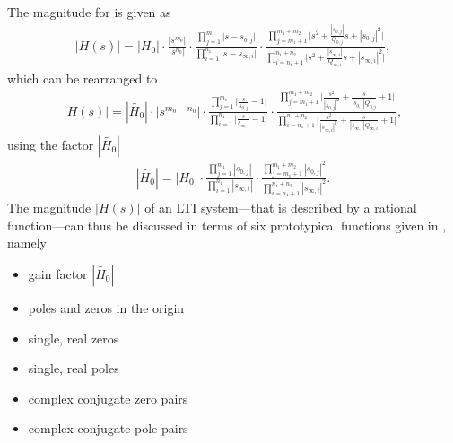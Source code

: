 The magnitude for  is given as
\begin{align}
|H(s)| = |H_0|
\cdot
\frac
{|s^{m_0}|}
{|s^{n_0}|}
\cdot
\frac
{\prod\limits_{j=1}^{m_1} \bigg|s-s_{0,j}\bigg|}
{\prod\limits_{i=1}^{n_1} \bigg|s-s_{\infty,i}\bigg|}
\cdot
\frac
{\prod\limits_{j=m_1+1}^{m_1+m_2} \bigg|s^2 + \frac{|s_{0,j}|}{Q_{0,j}} s + |s_{0,j}|^2\bigg|}
{\prod\limits_{i=n_1+1}^{n_1+n_2} \bigg|s^2 + \frac{|s_{\infty,i}|}{Q_{\infty,i}} s + |s_{\infty,i}|^2\bigg|},
\end{align}
which can be rearranged to
\begin{align}
\label{eq:Hs_sorted_for_Bode_Mag}
|H(s)| = |\tilde{H_0}|
\cdot
|s^{m_0-n_0}|
\cdot
\frac
{\prod\limits_{j=1}^{m_1} \bigg|\frac{s}{s_{0,j}}-1\bigg|}
{\prod\limits_{i=1}^{n_1} \bigg|\frac{s}{s_{\infty,i}}-1\bigg|}
\cdot
\frac
{\prod\limits_{j=m_1+1}^{m_1+m_2} \bigg|\frac{s^2}{|s_{0,j}|^2} + \frac{s}{|s_{0,j}| Q_{0,j}} + 1\bigg|}
{\prod\limits_{i=n_1+1}^{n_1+n_2} \bigg|\frac{s^2}{|s_{\infty,i}|^2} + \frac{s}{|s_{\infty,i}| Q_{\infty,i}} + 1\bigg|},
\end{align}
using the factor $|\tilde{H_0}|$
\begin{align}
\label{eq:H0tilde}
|\tilde{H_0}| = |{H_0}|
\cdot
\frac
{\prod\limits_{j=1}^{m_1} |s_{0,j}|}
{\prod\limits_{i=1}^{n_1} |s_{\infty,i}|}
\cdot
\frac
{\prod\limits_{j=m_1+1}^{m_1+m_2} |s_{0,j}|^2}
{\prod\limits_{i=n_1+1}^{n_1+n_2} |s_{\infty,i}|^2}.
\end{align}
%
The magnitude $|H(s)|$ of an LTI system---that is described by a rational function---can
thus be discussed in terms of six prototypical functions given in
, namely
\begin{itemize}
\item gain factor $|\tilde{H_0}|$
\item poles and zeros in the origin
\item single, real zeros
\item single, real poles
\item complex conjugate zero pairs
\item complex conjugate pole pairs
\end{itemize}

